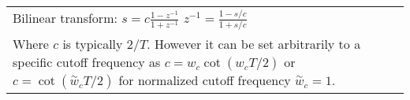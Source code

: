 \begin{tabular}{@{}L@{}}
Bilinear transform:
$s = c\frac{1 - z^{-1}}{1 + z^{-1}}$
$z^{-1} = \frac{1 - s/c}{1 + s/c}$ \\
Where $c$ is typically $2/T$. However it can be set arbitrarily to a specific
cutoff frequency as 
$c = w_c \cot(w_c T / 2)$ or
$c = \cot(
\stackrel{\sim}{w}_c T / 2)$ for normalized cutoff frequency 
$\stackrel{\sim}{w}_c = 1$. 
\end{tabular}
